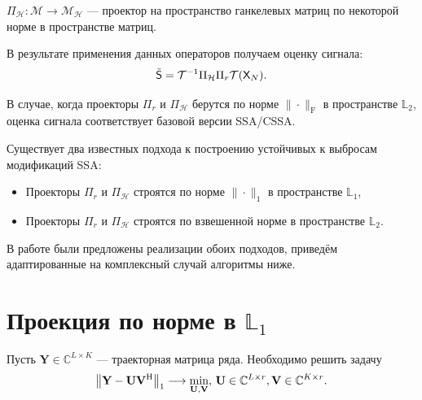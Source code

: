 \documentclass[specialist,
               substylefile = spbu.rtx,
               subf,href,colorlinks=true, 12pt]{disser}
\begin{document}
$\Pi_{\mathcal{H}}:\mathcal{M} \rightarrow \mathcal{M}_{\mathcal{H}}$ --- проектор на пространство ганкелевых матриц по некоторой норме в пространстве матриц.

В результате применения данных операторов получаем оценку сигнала:
\begin{equation*}
	\tilde{\textsf{S}} = \mathcal{T}^{-1} \Pi_{\mathcal{H}} \Pi_{r} \mathcal{T} (\textsf{X}_N).
\end{equation*}

В случае, когда проекторы $\Pi_r$ и $\Pi_{\mathcal{H}}$ берутся по норме $\|\cdot\|_\mathrm{F}$ в пространстве $\mathbb{L}_2$, оценка сигнала соответствует базовой версии SSA/CSSA.

Существует два известных подхода к построению устойчивых к выбросам модификаций SSA:

\begin{itemize}
	\item Проекторы $ \Pi_{r}$ и $\Pi_{\mathcal{H}} $ строятся по норме $\|\cdot\|_1$ в пространстве $\mathbb{L}_1$,
	\item Проекторы $ \Pi_{r}$ и $\Pi_{\mathcal{H}} $ строятся по взвешенной норме в пространстве $\mathbb{L}_2$.
\end{itemize}

В работе \cite{Tretyakova20} были предложены реализации обоих подходов, приведём адаптированные на комплексный случай алгоритмы ниже.


\section{Проекция по норме в $\mathbb{L}_1$}

Пусть $\mathbf{Y} \in \mathbb{C}^{L\times K}$ --- траекторная матрица ряда.
Необходимо решить задачу
\begin{equation*}
	\norm{\mathbf{Y}-\mathbf{U}\mathbf{V}^{\mathrm{H}}}_1 \longrightarrow \min_{\mathbf{U},\mathbf{V}}, \, \mathbf{U} \in \mathbb{C}^{L\times r}, \mathbf{V} \in \mathbb{C}^{K\times r}.
\end{equation*}
\end{document}
